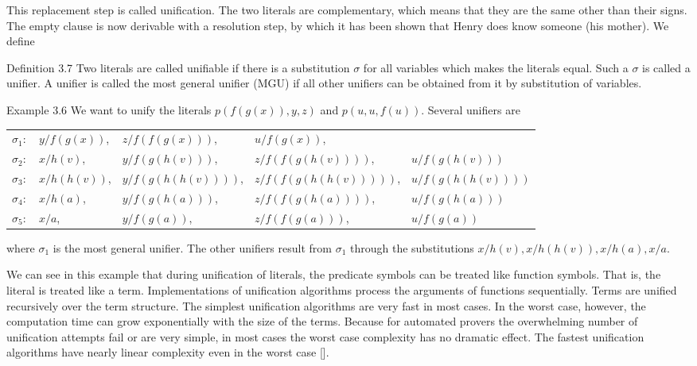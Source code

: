 \documentclass[10pt]{article}
\begin{document}
This replacement step is called unification. The two literals are complementary, which means that they are the same other than their signs. The empty clause is now derivable with a resolution step, by which it has been shown that Henry does know someone (his mother). We define

Definition 3.7 Two literals are called unifiable if there is a substitution $\sigma$ for all variables which makes the literals equal. Such a $\sigma$ is called a unifier. A unifier is called the most general unifier (MGU) if all other unifiers can be obtained from it by substitution of variables.


Example 3.6 We want to unify the literals $p(f(g(x)), y, z)$ and $p(u, u, f(u))$. Several unifiers are

\begin{center}
\begin{tabular}{lllll}
$\sigma_{1}:$ & $y / f(g(x))$, & $z / f(f(g(x)))$, & $u / f(g(x))$, &  \\
$\sigma_{2}:$ & $x / h(v)$, & $y / f(g(h(v)))$, & $z / f(f(g(h(v))))$, & $u / f(g(h(v)))$ \\
$\sigma_{3}:$ & $x / h(h(v))$, & $y / f(g(h(h(v))))$, & $z / f(f(g(h(h(v)))))$, & $u / f(g(h(h(v))))$ \\
$\sigma_{4}:$ & $x / h(a)$, & $y / f(g(h(a)))$, & $z / f(f(g(h(a))))$, & $u / f(g(h(a)))$ \\
$\sigma_{5}:$ & $x / a$, & $y / f(g(a))$, & $z / f(f(g(a)))$, & $u / f(g(a))$ \\
\end{tabular}
\end{center}

where $\sigma_{1}$ is the most general unifier. The other unifiers result from $\sigma_{1}$ through the substitutions $x / h(v), x / h(h(v)), x / h(a), x / a$.

We can see in this example that during unification of literals, the predicate symbols can be treated like function symbols. That is, the literal is treated like a term. Implementations of unification algorithms process the arguments of functions sequentially. Terms are unified recursively over the term structure. The simplest unification algorithms are very fast in most cases. In the worst case, however, the computation time can grow exponentially with the size of the terms. Because for automated provers the overwhelming number of unification attempts fail or are very simple, in most cases the worst case complexity has no dramatic effect. The fastest unification algorithms have nearly linear complexity even in the worst case [\cite{bibel1982automated}].
\end{document}
